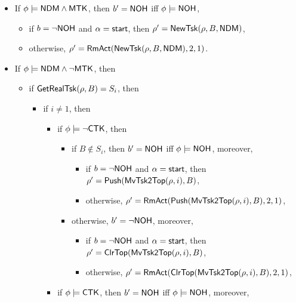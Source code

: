 \begin{itemize}
\item If $\phi \models {\sf NDM} \wedge {\sf MTK}$, then $b' = {\sf NOH}$ iff $\phi  \models {\sf NOH}$, 
    \begin{itemize}
    	\item if $b = \neg {\sf NOH}$ and $\alpha = {\mathsf{start} }$, then $\rho'=\mathsf{NewTsk}(\rho, B, {\sf NDM})$, 
	\item otherwise, $\rho'= \mathsf{RmAct}(\mathsf{NewTsk}(\rho, B, {\sf NDM}), 2, 1)$.
    \end{itemize}
    \item If $\phi \models {\sf NDM} \wedge \neg {\sf MTK}$, then
   \begin{itemize}
        \item if $\mathsf{GetRealTsk}(\rho, B) = S_i$, then
	\begin{itemize}
		\item if $i \neq 1$, then
        			\begin{itemize}
            			\item if $\phi \models \neg {\sf CTK}$, then 
				\begin{itemize}
					\item if $B \not \in S_i$, then $b' = {\sf NOH}$ iff $\phi  \models {\sf NOH}$, moreover, 
					\begin{itemize}
						\item if $b = \neg {\sf NOH}$ and $\alpha = {\mathsf{start} }$, then $\rho' = \mathsf{Push}(\mathsf{MvTsk2Top}(\rho, i), B)$, 
						\item otherwise, $\rho' = \mathsf{RmAct}(\mathsf{Push}(\mathsf{MvTsk2Top}(\rho, i), B), 2, 1)$, 
					\end{itemize}
					\item otherwise, $b' = \neg {\sf NOH}$,
					moreover, 
					\begin{itemize}
						\item if $b = \neg {\sf NOH}$ and $\alpha = {\mathsf{start} }$, then $\rho'=\mathsf{ClrTop}(\mathsf{MvTsk2Top}(\rho, i), B)$, 
						\item otherwise,  $\rho'= \mathsf{RmAct}(\mathsf{ClrTop}(\mathsf{MvTsk2Top}(\rho, i), B), 2, 1)$, 
					\end{itemize}
				\end{itemize}
            			\item if $\phi \models {\sf CTK}$, then $b' = {\sf NOH}$ iff $\phi  \models {\sf NOH}$, moreover, 

\end{itemize}
\end{itemize}
\end{itemize}
\end{itemize}
